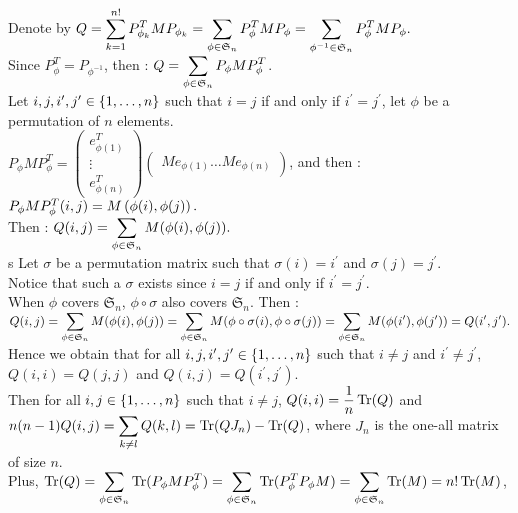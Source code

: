 \pr

Denote by $Q = \displaystyle\sum\limits_{k=1}^{n!} P_{\phi_{k}}^{T} M P_{\phi_{k}} = \displaystyle\sum\limits_{\phi \in \mathfrak{S}_{n}}P_{\phi}^{T} M P_{\phi} = \displaystyle\sum\limits_{\phi^{-1} \in \mathfrak{S}_{n}}P_{\phi}^{T} M P_{\phi}.$\\
Since $P_{\phi}^{T} = P_{\phi^{-1}}$, then : $Q = \displaystyle\sum\limits_{\phi \in \mathfrak{S}_{n}}P_{\phi} M P_{\phi}^{T}$.\\
Let $i,j,i^{\prime},j^{\prime} \in \left\{1,\dots,n\right\}$ such that $i = j$ if and only if $i^{\prime} = j^{\prime}$, let $\phi$ be a permutation of $n$ elements.\\
$P_{\phi} M P_{\phi}^{T} = \begin{pmatrix} e_{\phi(1)}^{T} \\ \vdots \\ e_{\phi(n)}^{T} \end{pmatrix} \begin{pmatrix} M e_{\phi(1)}  \hdots M e_{\phi(n)} \end{pmatrix} $, and then : $P_{\phi} M P_{\phi}^{T} (i,j) = M\left(\phi(i),\phi(j)\right).$\\
Then : $Q(i,j) =\displaystyle\sum\limits_{\phi \in \mathfrak{S}_{n}} M(\phi(i),\phi(j)).$\\s
Let $\sigma$ be a permutation matrix such that $\sigma(i) = i^{\prime}$ and $\sigma(j) = j^{\prime}$.\\
Notice that such a $\sigma$ exists since $i = j$ if and only if $i^{\prime} = j^{\prime}$.\\
When $\phi$ covers $\mathfrak{S}_{n}$, $\phi \circ \sigma$ also covers $\mathfrak{S}_{n}$. Then :\\
$Q(i,j) = \displaystyle\sum\limits_{\phi \in \mathfrak{S}_{n}} M(\phi(i),\phi(j)) =\displaystyle\sum\limits_{\phi \in \mathfrak{S}_{n}} M(\phi\circ\sigma(i),\phi\circ\sigma(j)) = \displaystyle\sum\limits_{\phi \in \mathfrak{S}_{n}} M(\phi(i^{\prime}),\phi(j^{\prime})) = Q(i^{\prime},j^{\prime}).$\\
Hence we obtain that for all $i,j,i^{\prime},j^{\prime} \in \left\{1,\dots,n\right\}$ such that $i \neq j$ and $i^{\prime} \neq j^{\prime}$, $Q(i,i) = Q(j,j)$ and $Q(i,j) = Q(i^{\prime},j^{\prime})$.\\
Then for all $i,j\in \left\{1,\dots,n\right\}$ such that $i\neq j$, $Q(i,i) = \displaystyle\frac{1}{n} \operatorname{Tr}(Q)$ and \\$n(n-1)Q(i,j) = \displaystyle\sum_{k\neq l} Q(k,l) = \operatorname{Tr}(QJ_{n})-\operatorname{Tr}(Q)$, where $J_{n}$ is the one-all matrix of size $n$.\\
Plus, $\operatorname{Tr}(Q) = \displaystyle\sum\limits_{\phi \in \mathfrak{S}_{n}} \operatorname{Tr}(P_{\phi} M P_{\phi}^{T} ) = \displaystyle\sum\limits_{\phi \in \mathfrak{S}_{n}} \operatorname{Tr}( P_{\phi}^{T} P_{\phi} M) =\displaystyle\sum\limits_{\phi \in \mathfrak{S}_{n}} \operatorname{Tr}(M) = n! \operatorname{Tr}(M)$,
